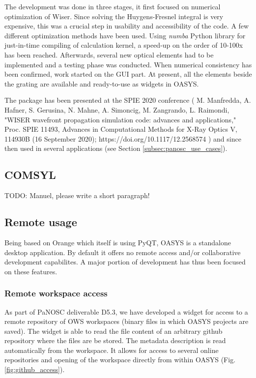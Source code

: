 \documentclass[11pt, a4paper]{article}
\begin{document}
The development was done in three stages, it first focused on numerical optimization of Wiser. Since solving the Huygens-Fresnel integral is very expensive, this was a crucial step in usability and accessibility of the code. A few different optimization methods have been used. Using \emph{numba} Python library for just-in-time compiling of calculation kernel, a speed-up on the order of 10-100x has been reached. Afterwards, several new optical elements had to be implemented and a testing phase was conducted. When numerical consistency has been confirmed, work started on the GUI part. At present, all the elements beside the grating are available and ready-to-use as widgets in OASYS.

The package has been presented at the SPIE 2020 conference (  M. Manfredda, A. Hafner, S. Gerusina, N. Mahne, A. Simoncig, M. Zangrando, L. Raimondi, "WISER wavefront propagation simulation code: advances and applications," Proc. SPIE 11493, Advances in Computational Methods for X-Ray Optics V, 114930B (16 September 2020); https://doi.org/10.1117/12.2568574 ) and since then used in several applications (see Section \ref{subsec:panosc_use_cases}).

\subsection{COMSYL}

TODO: Manuel, please write a short paragraph!

\subsection{Remote usage}

Being based on Orange which itself is using PyQT, OASYS is a standalone desktop application. By default it offers no remote access and/or collaborative development capabilites. A major portion of development has thus been focused on these features.

\subsubsection{Remote workspace access}

As part of PaNOSC deliverable D5.3, we have developed a widget for access to a remote repository of OWS workspaces (binary files in which OASYS projects are saved). The widget is able to read the file content of an arbitrary github repository where the files are be stored. The metadata description is read automatically from the workspace. It allows for access to several online repositories and opening of the workspace directly from within OASYS (Fig. \ref{fig:github_access}).
\end{document}

